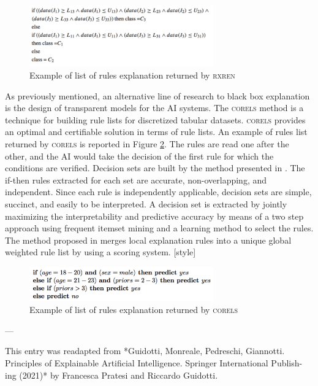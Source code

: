 \begin{figure}[!htb]
    \centering
    \includegraphics[width=300px]{TAILOR_T31_rules1.png}
    \caption{Example of list of rules explanation returned by \textsc{rxren}}
    \label{fig:rules_rxren}
\end{figure}


As previously mentioned, an alternative line of research to black box explanation
is the design of transparent models for the AI systems. The \textsc{corels} method \cite{angelino5} is
a technique for building rule lists for discretized tabular datasets. \textsc{corels} provides
an optimal and certifiable solution in terms of rule lists. An example of rules list
returned by \textsc{corels} is reported in Figure \ref{fig:rules_corels}. The rules are read one after the other,
and the AI would take the decision of the first rule for which the conditions are
verified. Decision sets are built by the method presented in \cite{lakkaraju39}. The if-then rules
extracted for each set are accurate, non-overlapping, and independent. Since each
rule is independently applicable, decision sets are simple, succinct, and easily to be
interpreted. A decision set is extracted by jointly maximizing the interpretability and
predictive accuracy by means of a two step approach using frequent itemset mining
and a learning method to select the rules. The method proposed in \cite{setzu63} merges local
explanation rules into a unique global weighted rule list by using a scoring system. [style]

\begin{figure}[!htb]
    \centering
    \includegraphics[width=300px]{TAILOR_T31_rules2.png}
    \caption{Example of list of rules explanation returned by \textsc{corels}}
    \label{fig:rules_corels}
\end{figure}





---
 
This entry was readapted from *Guidotti, Monreale, Pedreschi, Giannotti.
Principles of Explainable Artificial Intelligence. Springer International Publish-
ing (2021)* by Francesca Pratesi and Riccardo Guidotti.
